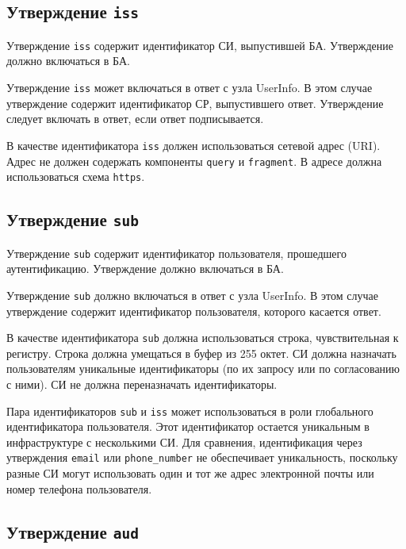 \label{CLAIMS.Auth}

\subsection{Утверждение \lstinline{iss}}\label{CLAIMS.Iss}

Утверждение \lstinline{iss} содержит идентификатор СИ, выпустившей БА.
%
Утверждение должно включаться в БА.

Утверждение \lstinline{iss} может включаться в ответ с узла UserInfo.
В этом случае утверждение содержит идентификатор СР, выпустившего ответ.
%
Утверждение следует включать в ответ, если ответ подписывается.

В качестве идентификатора \lstinline{iss} должен использоваться сетевой адрес 
(URI). 
%
Адрес не должен содержать компоненты \lstinline{query} и \lstinline{fragment}.
%
В адресе должна использоваться схема \lstinline{https}.

\subsection{Утверждение \lstinline{sub}}\label{CLAIMS.Sub}

Утверждение \lstinline{sub} содержит идентификатор пользователя, 
прошедшего аутентификацию.
%
Утверждение должно включаться в БА.

Утверждение \lstinline{sub} должно включаться в ответ с узла UserInfo.
%
В этом случае утверждение содержит идентификатор пользователя, которого 
касается ответ.

В качестве идентификатора \lstinline{sub} должна использоваться строка,
чувствительная к регистру. Строка должна умещаться в буфер из 255 октет.
%
СИ должна назначать пользователям уникальные идентификаторы (по их запросу или 
по согласованию с ними). СИ не должна переназначать идентификаторы.

\begin{note*}
Пара идентификаторов \lstinline{sub} и \lstinline{iss} может использоваться
в роли глобального идентификатора пользователя. Этот идентификатор 
остается уникальным в инфраструктуре с несколькими СИ.
%
Для сравнения, идентификация через утверждения \lstinline{email} или
\lstinline{phone_number} не обеспечивает уникальность, поскольку разные СИ могут
использовать один и тот же адрес электронной почты или номер телефона
пользователя.
\end{note*}

\subsection{Утверждение \lstinline{aud}}\label{CLAIMS.Aud}

